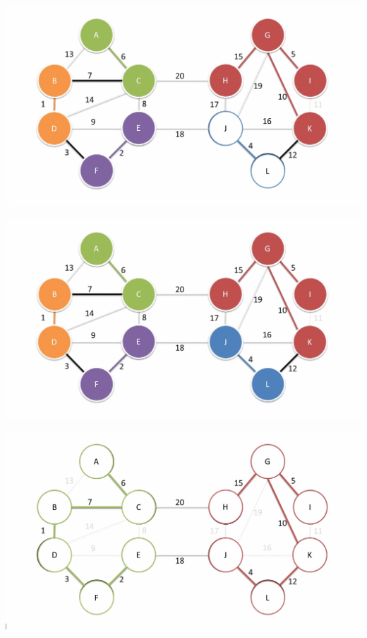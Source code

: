 \documentclass[
	11pt, %
]{beamer}
\begin{document}
\begin{frame}
    \includegraphics[width = 1\textwidth]{baruvka-example/frame_27_delay-1s.png}
\end{frame}
\begin{frame}
    \includegraphics[width = 1\textwidth]{baruvka-example/frame_28_delay-2s.png}
\end{frame}
\begin{frame}
    \includegraphics[width = 1\textwidth]{baruvka-example/frame_29_delay-3s.png}
\end{frame}
\end{document}
